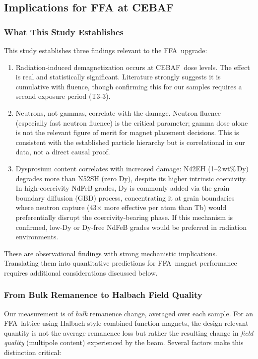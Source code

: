 \documentclass[11pt,letterpaper]{article}
\newcommand{\CEBAF}{CEBAF}
\newcommand{\FFA}{FFA}
\begin{document}
\subsection{Implications for FFA at CEBAF}

\subsubsection{What This Study Establishes}

This study establishes three findings relevant to the \FFA~upgrade:
\begin{enumerate}
    \item Radiation-induced demagnetization occurs at \CEBAF~dose
    levels. The effect is real and statistically significant. Literature
    strongly suggests it is cumulative with fluence, though confirming this
    for our samples requires a second exposure period (T3-3).
    \item Neutrons, not gammas, correlate with the damage. Neutron
    fluence (especially fast neutron fluence) is the critical parameter;
    gamma dose alone is not the relevant figure of merit for magnet placement
    decisions. This is consistent with the established particle hierarchy
    but is correlational in our data, not a direct causal proof.
    \item Dysprosium content correlates with increased damage:
    N42EH (1--2\,wt\%\,Dy) degrades more than N52SH (zero Dy), despite its
    higher intrinsic coercivity. In high-coercivity NdFeB grades, Dy is
    commonly added via the grain boundary diffusion (GBD) process,
    concentrating it at grain boundaries where neutron capture
    (43$\times$ more effective per atom than Tb) would preferentially
    disrupt the coercivity-bearing phase. If this mechanism is confirmed,
    low-Dy or Dy-free NdFeB grades would be preferred in radiation
    environments.
\end{enumerate}

These are observational findings with strong mechanistic implications.
Translating them into quantitative
predictions for \FFA~magnet performance requires additional considerations
discussed below.

\subsubsection{From Bulk Remanence to Halbach Field Quality}

Our measurement is of \emph{bulk} remanence change, averaged over each
sample. For an \FFA~lattice using Halbach-style combined-function magnets,
the design-relevant quantity is not the average remanence loss but rather
the resulting change in \emph{field quality} (multipole content) experienced
by the beam. Several factors make this distinction critical:
\end{document}
